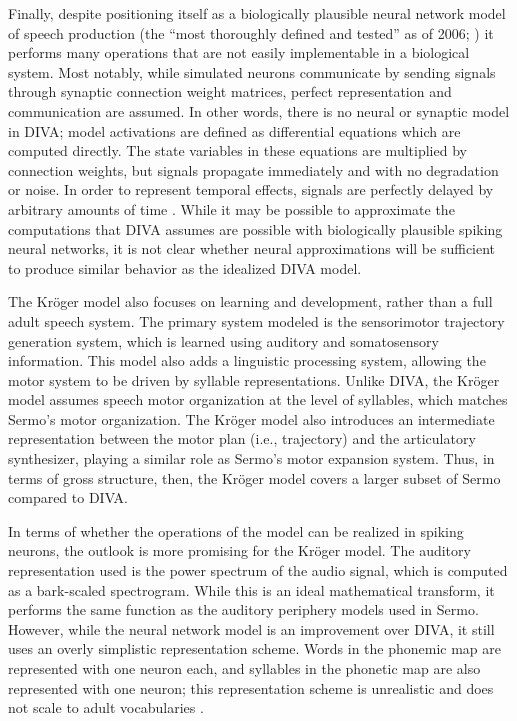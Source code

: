 Finally, despite positioning itself as
a biologically plausible neural network model
of speech production
(the ``most thoroughly defined and tested''
as of 2006; \citealp{guenther2006a})
it performs many operations
that are not easily implementable
in a biological system.
Most notably,
while simulated neurons communicate
by sending signals through
synaptic connection weight matrices,
perfect representation and communication
are assumed.
In other words, there is no neural
or synaptic model in DIVA;
model activations are defined as
differential equations
which are computed directly.
The state variables in these equations
are multiplied by connection weights,
but signals propagate immediately
and with no degradation or noise.
In order to represent temporal effects,
signals are perfectly delayed
by arbitrary amounts of time
\citep{nieto-castanon2011}.
While it may be possible to approximate
the computations that
DIVA assumes are possible
with biologically plausible spiking neural networks,
it is not clear whether
neural approximations will
be sufficient to produce similar behavior
as the idealized DIVA model.

The Kr\"{o}ger model also
focuses on learning and development,
rather than a full adult speech system.
The primary system modeled
is the sensorimotor trajectory generation system,
which is learned using
auditory and somatosensory information.
This model also adds
a linguistic processing system,
allowing the motor system to be driven
by syllable representations.
Unlike DIVA, the Kr\"{o}ger model
assumes speech motor organization
at the level of syllables,
which matches Sermo's motor organization.
The Kr\"{o}ger model also
introduces an intermediate representation
between the motor plan (i.e., trajectory)
and the articulatory synthesizer,
playing a similar role as Sermo's
motor expansion system.
Thus, in terms of gross structure, then,
the Kr\"{o}ger model covers a larger subset
of Sermo compared to DIVA.


In terms of whether the operations
of the model can be realized in spiking neurons,
the outlook is more promising
for the Kr\"{o}ger model.
The auditory representation used
is the power spectrum of the audio signal,
which is computed as a bark-scaled spectrogram.
While this is an ideal mathematical transform,
it performs the same function as the
auditory periphery models used in Sermo.
However, while the neural network model
is an improvement over DIVA,
it still uses an overly simplistic
representation scheme.
Words in the phonemic map
are represented with one neuron each,
and syllables in the phonetic map
are also represented with one neuron;
this representation scheme is unrealistic
and  does not scale to adult vocabularies
\citep{crawford2014}.

